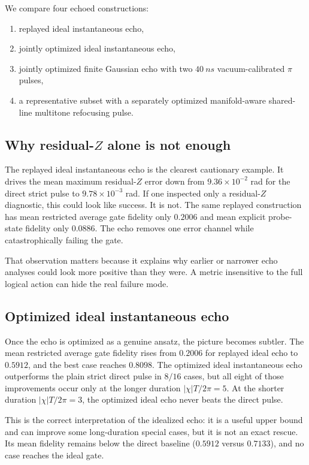 \documentclass[aps,pra,twocolumn,reprint,floatfix,amsmath,amssymb]{revtex4-2}
\begin{document}
We compare four echoed constructions:
\begin{enumerate}
  \item replayed ideal instantaneous echo,
  \item jointly optimized ideal instantaneous echo,
  \item jointly optimized finite Gaussian echo with two \(\SI{40}{ns}\) vacuum-calibrated \(\pi\) pulses,
  \item a representative subset with a separately optimized manifold-aware shared-line multitone refocusing pulse.
\end{enumerate}

\subsection{Why residual-\(Z\) alone is not enough}

The replayed ideal instantaneous echo is the clearest cautionary example. It drives the mean maximum residual-\(Z\) error down from \(9.36\times10^{-2}\) rad for the direct strict pulse to \(9.78\times10^{-3}\) rad. If one inspected only a residual-\(Z\) diagnostic, this could look like success. It is not. The same replayed construction has mean restricted average gate fidelity only \(0.2006\) and mean explicit probe-state fidelity only \(0.0886\). The echo removes one error channel while catastrophically failing the gate.

That observation matters because it explains why earlier or narrower echo analyses could look more positive than they were. A metric insensitive to the full logical action can hide the real failure mode.

\subsection{Optimized ideal instantaneous echo}

Once the echo is optimized as a genuine ansatz, the picture becomes subtler. The mean restricted average gate fidelity rises from \(0.2006\) for replayed ideal echo to \(0.5912\), and the best case reaches \(0.8098\). The optimized ideal instantaneous echo outperforms the plain strict direct pulse in \(8/16\) cases, but all eight of those improvements occur only at the longer duration \(|\chi|T/2\pi=5\). At the shorter duration \(|\chi|T/2\pi=3\), the optimized ideal echo never beats the direct pulse.

This is the correct interpretation of the idealized echo: it is a useful upper bound and can improve some long-duration special cases, but it is not an exact rescue. Its mean fidelity remains below the direct baseline (\(0.5912\) versus \(0.7133\)), and no case reaches the ideal gate.
\end{document}
